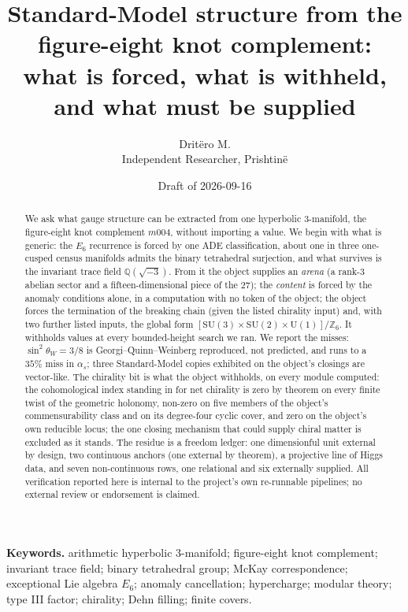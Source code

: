 \documentclass[11pt,a4paper]{article}
\title{Standard-Model structure from the figure-eight knot complement:\\ what is forced, what is withheld,\\ and what must be supplied}
\author{Drit\"ero M.\\ \small Independent Researcher, Prishtin\"e}
\date{Draft of 2026-09-16}
\theoremstyle{definition}
\theoremstyle{remark}
\newcommand{\Q}{\mathbb{Q}}
\newcommand{\Z}{\mathbb{Z}}
\begin{document}
\maketitle

\begin{abstract}
We ask what gauge structure can be extracted from one hyperbolic 3-manifold, the figure-eight knot
complement $m004$, without importing a value. We begin with what is generic: the $E_6$ recurrence is forced
by one ADE classification, about one in three one-cusped census manifolds admits the binary tetrahedral
surjection, and what survives is the invariant trace field $\Q(\sqrt{-3})$. From it the object supplies an
\emph{arena} (a rank-3 abelian sector and a fifteen-dimensional piece of the $27$); the \emph{content} is
forced by the anomaly conditions alone, in a computation with no token of the object; the object
forces the termination of the breaking chain (given the listed chirality input) and, with two further listed inputs, the global form
$[\mathrm{SU}(3)\times\mathrm{SU}(2)\times\mathrm{U}(1)]/\Z_6$. It withholds values at every bounded-height
search we ran. We report the misses: $\sin^2\theta_W=3/8$ is Georgi--Quinn--Weinberg reproduced, not
predicted, and runs to a $35\%$ miss in $\alpha_s$; three Standard-Model copies exhibited on the
object's closings are vector-like. The chirality bit is what the object withholds, on every module computed:
the cohomological index standing in for net chirality is zero by theorem on every finite twist of the geometric
holonomy, non-zero on five members of the object's commensurability class and on its
degree-four cyclic cover, and zero on the object's own reducible locus; the one closing
mechanism that could supply chiral matter is excluded as it stands. The residue is a freedom
ledger: one dimensionful unit external by design, two continuous anchors (one external by theorem), a
projective line of Higgs data, and seven non-continuous rows, one relational and six externally supplied.
All verification reported here is internal to the project's own re-runnable pipelines; no external
review or endorsement is claimed.
\end{abstract}

\medskip
\noindent\footnotesize
\textbf{Keywords.} arithmetic hyperbolic 3-manifold; figure-eight knot complement; invariant trace
field; binary tetrahedral group; McKay correspondence; exceptional Lie algebra $E_6$; anomaly
cancellation; hypercharge; modular theory; type III factor; chirality; Dehn filling; finite covers.
\end{document}
